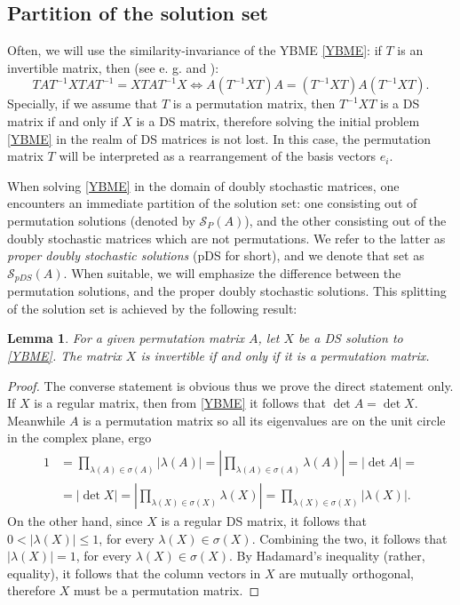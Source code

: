 \documentclass{article}
\newtheorem{lemma}{Lemma}[section]
\theoremstyle{definition}\newtheorem{example}{Example}[section]
\def\S{{\mathcal{S}}}
\begin{document}
	
	
\subsection{Partition of the solution set}	
	
	Often, we will use the similarity-invariance of the YBME \eqref{YBME}: if $T$ is an invertible matrix, then (see e. g. \cite{NCDBDD1} and \cite{NCDBDD2}):
	\begin{equation}
		\label{similarity}
		TAT^{-1}XTAT^{-1}=XTAT^{-1}X\Leftrightarrow A\left(T^{-1}XT\right)A=\left(T^{-1}XT\right)A\left(T^{-1}XT\right).\end{equation}
	Specially, if we assume that $T$ is a permutation matrix, then $T^{-1}XT$ is a DS matrix if and only if $X$ is a DS matrix, therefore solving the initial problem \eqref{YBME} in the realm of DS matrices is not lost. In this case, the permutation matrix $T$ will be interpreted as a rearrangement of the basis vectors $e_i$. 
	
	
	
	
	
	
	When solving \eqref{YBME} in the domain of doubly stochastic matrices, one encounters an immediate partition of the solution set: one consisting out of permutation solutions (denoted by $\S_P(A)$), and the other consisting out of the doubly stochastic matrices which are not permutations. We refer to the latter as {\it proper doubly stochastic solutions} (pDS for short), and we denote that set as $\S_{pDS}(A)$. When suitable, we will emphasize the difference between the permutation solutions, and the  proper doubly stochastic solutions. This splitting of the solution set is achieved by the following result:
	
	\begin{lemma}\label{regsing}
		For a given permutation matrix $A$, let $X$ be a DS solution to \eqref{YBME}. The matrix $X$ is invertible if and only if it is a permutation matrix.
	\end{lemma}
	\begin{proof} The converse statement is obvious thus we prove the direct statement only. If $X$ is a regular matrix, then from \eqref{YBME} it follows that $\det A=\det X$. Meanwhile $A$ is a permutation matrix so all its eigenvalues are on the unit circle in the complex plane, ergo
		$$\begin{aligned}
			1&=\prod_{\lambda(A)\in\sigma(A)}\left|\lambda(A)\right|=\left|\prod_{\lambda(A)\in\sigma(A)}\lambda(A)\right|=\left|\det A\right|=\\
			&=\left|\det X\right|=\left|\prod_{\lambda(X)\in\sigma(X)}\lambda(X)\right|=\prod_{\lambda(X)\in\sigma(X)}\left|\lambda(X)\right|.
		\end{aligned}$$
		On the other hand, since $X$ is a regular DS matrix, it follows that $0<|\lambda(X)|\leq 1$, for every $\lambda(X)\in\sigma(X)$. Combining the two, it follows that $|\lambda(X)|=1$, for every $\lambda(X)\in\sigma(X)$. By Hadamard's inequality (rather, equality), it follows that the column vectors in $X$ are mutually orthogonal, therefore $X$ must be a permutation matrix. 
	\end{proof}
	
\end{document}
